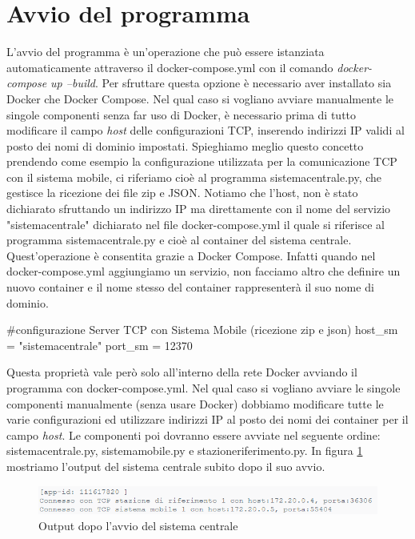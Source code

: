 \section{Avvio del programma}
L'avvio del programma è un'operazione che può essere istanziata automaticamente attraverso il docker-compose.yml con il comando \textit{docker-compose up --build}. Per sfruttare questa opzione è necessario aver installato sia Docker che Docker Compose. Nel qual caso si vogliano avviare manualmente le singole componenti senza far uso di Docker, è necessario prima di tutto modificare il campo \textit{host} delle configurazioni TCP, inserendo indirizzi IP validi al posto dei nomi di dominio impostati. Spieghiamo meglio questo concetto prendendo come esempio la configurazione utilizzata per la comunicazione TCP con il sistema mobile, ci riferiamo cioè al programma sistemacentrale.py, che gestisce la ricezione dei file zip e JSON. Notiamo che l'host, non è stato dichiarato sfruttando un indirizzo IP ma direttamente con il nome del servizio "sistemacentrale" dichiarato nel file docker-compose.yml il quale si riferisce al programma sistemacentrale.py e cioè al container del sistema centrale. Quest'operazione è consentita grazie a Docker Compose. Infatti quando nel docker-compose.yml aggiungiamo un servizio, non facciamo altro che definire un nuovo container e il nome stesso del container rappresenterà il suo nome di dominio.
\begin{pythoncode}
#configurazione Server TCP con Sistema Mobile (ricezione zip e json)
host_sm = "sistemacentrale"
port_sm = 12370
\end{pythoncode}
Questa proprietà vale però solo all'interno della rete Docker avviando il programma con docker-compose.yml. Nel qual caso si vogliano avviare le singole componenti manualmente (senza usare Docker) dobbiamo modificare tutte le varie configurazioni ed utilizzare indirizzi IP al posto dei nomi dei container per il campo \textit{host}. Le componenti poi dovranno essere avviate nel seguente ordine: sistemacentrale.py, sistemamobile.py e stazioneriferimento.py. In figura \ref{fig: sistemacentraleoutput } mostriamo l'output del sistema centrale subito dopo il suo avvio.
\begin{figure}[!h]
\flushleft
\includegraphics[scale=1.1]{images/simulazione/outputsistemacentrale.png}
\caption{Output dopo l'avvio del sistema centrale}
\label{fig: sistemacentraleoutput }
\end{figure}\\
